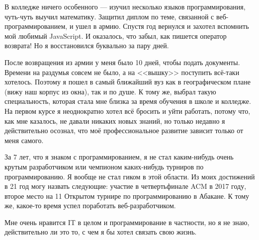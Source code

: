 		В колледже ничего особенного --- изучил несколько языков программирования, чуть-чуть выучил математику. Защитил диплом по теме, связанной с веб-программированием, и ушел в армию. Спустя год вернулся и захотел вспомнить мой любимый JavaScript. И оказалось, что забыл, как пишется оператор возврата! Но я восстановился буквально за пару дней.
		
		После возвращения из армии у меня было 10 дней, чтобы подать документы. Времени на раздумья совсем не было, а на <<вышку>> поступить всё-таки хотелось. Поэтому я пошел в самый ближайший вуз как в географическом плане (вижу наш корпус из окна), так и по душе. К тому же, выбрал такую специальность, которая стала мне близка за время обучения в школе и колледже. На первом курсе я неоднократно хотел всё бросить и уйти работать, потому что, как мне казалось, не давали никаких новых знаний, но только недавно я действительно осознал, что моё профессиональное развитие зависит только от меня самого.
		
		За 7 лет, что я знаком с программированием, я не стал каким-нибудь очень крутым разработчиком или чемпионом каких-нибудь турниров по программированию. Я вообще не стал гиком в этой области. Из моих достижений в 21 год могу назвать следующие: участие в четвертьфинале ACM в 2017 году, второе место на 11 Открытом турнире по программированию в Абакане. К тому же, какое-то время успел поработать веб-разработчиком.
		
		Мне очень нравится IT в целом и программирование в частности, но я не знаю, действительно ли это то, с чем я бы хотел связать свою жизнь.